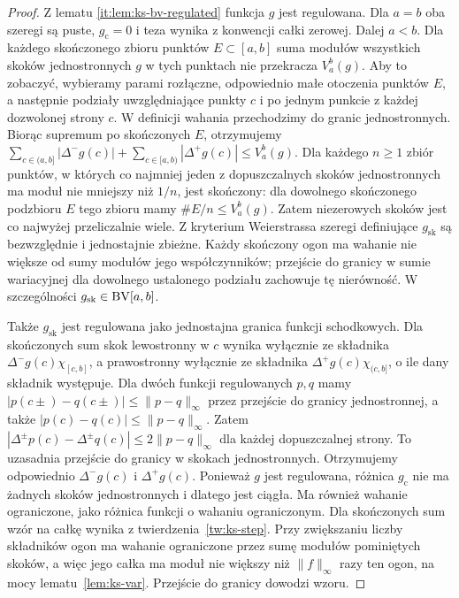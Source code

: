 \begin{proof}
Z lematu \ref{it:lem:ks-bv-regulated} funkcja $g$ jest
regulowana. Dla $a=b$ oba szeregi są puste, $g_{\mathrm c}=0$
i teza wynika z konwencji całki zerowej. Dalej $a<b$. Dla każdego skończonego zbioru punktów $E\subset[a,b]$ suma modułów wszystkich skoków jednostronnych $g$ w tych punktach nie przekracza $V_a^b(g)$. Aby to zobaczyć, wybieramy parami rozłączne, odpowiednio małe otoczenia punktów $E$, a następnie podziały uwzględniające punkty $c$ i po jednym punkcie z każdej dozwolonej strony $c$. W definicji wahania przechodzimy do granic jednostronnych. Biorąc supremum po skończonych $E$, otrzymujemy
$\sum_{c\in(a,b]}|\Delta^-g(c)|+\sum_{c\in[a,b)}|\Delta^+g(c)|\le V_a^b(g)$. Dla każdego $n\ge1$ zbiór punktów, w których
co najmniej jeden z dopuszczalnych skoków jednostronnych
ma moduł nie mniejszy niż $1/n$, jest skończony:
dla dowolnego skończonego podzbioru $E$ tego zbioru
mamy $\#E/n\le V_a^b(g)$. Zatem niezerowych skoków jest co najwyżej przeliczalnie wiele. Z kryterium Weierstrassa szeregi definiujące $g_{\mathrm{sk}}$ są bezwzględnie i jednostajnie zbieżne. Każdy skończony ogon ma wahanie nie większe od sumy modułów jego współczynników; przejście do granicy w sumie wariacyjnej dla dowolnego ustalonego podziału zachowuje tę nierówność. W szczególności $g_{\mathrm{sk}}\in\mathrm{BV}[a,b]$.

Także $g_{\mathrm{sk}}$ jest regulowana jako jednostajna granica funkcji schodkowych. Dla skończonych sum skok lewostronny w $c$ wynika
wyłącznie ze składnika $\Delta^-g(c)\chi_{[c,b]}$,
a prawostronny wyłącznie ze składnika
$\Delta^+g(c)\chi_{(c,b]}$, o ile dany składnik występuje.
Dla dwóch funkcji regulowanych $p,q$ mamy
$|p(c\pm)-q(c\pm)|\le\|p-q\|_\infty$ przez przejście
do granicy jednostronnej, a także
$|p(c)-q(c)|\le\|p-q\|_\infty$. Zatem
$|\Delta^\pm p(c)-\Delta^\pm q(c)|\le2\|p-q\|_\infty$
dla każdej dopuszczalnej strony. To uzasadnia przejście
do granicy w skokach jednostronnych. Otrzymujemy odpowiednio $\Delta^-g(c)$ i $\Delta^+g(c)$. Ponieważ $g$ jest regulowana, różnica $g_{\mathrm c}$ nie ma żadnych skoków jednostronnych i dlatego jest ciągła. Ma również wahanie ograniczone, jako różnica funkcji o wahaniu ograniczonym. Dla skończonych sum wzór na całkę wynika z twierdzenia~\ref{tw:ks-step}. Przy zwiększaniu liczby składników ogon ma wahanie ograniczone przez sumę modułów pominiętych skoków, a więc jego całka ma moduł nie większy niż $\|f\|_\infty$ razy ten ogon, na mocy lematu~\ref{lem:ks-var}. Przejście do granicy dowodzi wzoru.
\end{proof}


